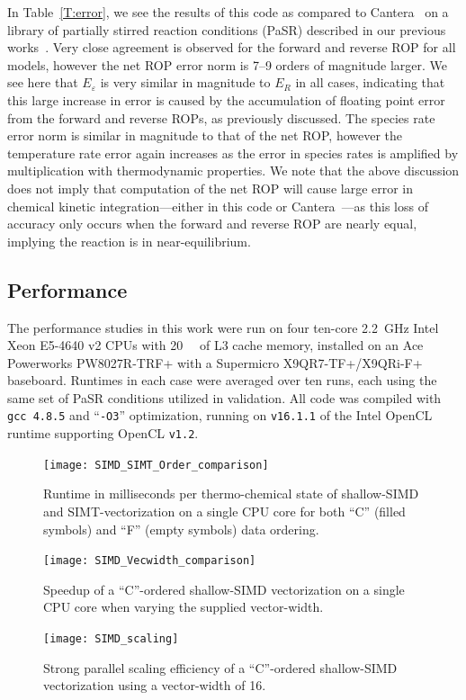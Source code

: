 \documentclass[12pt,number,sort&compress]{elsarticle}
\begin{document}
In Table~\ref{T:error}, we see the results of this code as compared to Cantera~\cite{Cantera} on a library of partially stirred reaction conditions (PaSR) described in our previous works~\cite{CurtisGPU:2017,Niemeyer:2016aa}.
Very close agreement is observed for the forward and reverse ROP for all models, however the net ROP error norm is \numrange{7}{9} orders of magnitude larger.
We see here that $E_{\varepsilon}$ is very similar in magnitude to $E_R$ in all cases, indicating that this large increase in error is caused by the accumulation of floating point error from the forward and reverse ROPs, as previously discussed.
The species rate error norm is similar in magnitude to that of the net ROP, however the temperature rate error again increases as the error in species rates is amplified by multiplication with thermodynamic properties.
We note that the above discussion does not imply that computation of the net ROP will cause large error in chemical kinetic integration---either in this code or Cantera~\cite{Cantera}---as this loss of accuracy only occurs when the forward and reverse ROP are nearly equal, implying the reaction is in near-equilibrium.

\subsection{Performance}
\label{S:results}
The performance studies in this work were run on four ten-core \SI{2.2}{\giga\hertz} Intel Xeon E5-4640 v2 CPUs with \SI{20}{\mega\byte} of L3 cache memory, installed on an Ace Powerworks PW8027R-TRF+ with a Supermicro X9QR7-TF+/X9QRi-F+ baseboard.
Runtimes in each case were averaged over ten runs, each using the same set of PaSR conditions utilized in validation.
All code was compiled with \texttt{gcc 4.8.5} and ``\texttt{-O3}'' optimization, running on \texttt{v16.1.1} of the Intel OpenCL runtime supporting OpenCL \texttt{v1.2}.

\begin{figure}[htb]
  \centering
  \begin{minipage}[t]{0.48\linewidth}
    \texttt{[image: SIMD\_SIMT\_Order\_comparison]}
    \caption{Runtime in milliseconds per thermo-chemical state of shallow-SIMD and SIMT-vectorization on a single CPU core for both ``C'' (filled symbols) and ``F'' (empty symbols) data ordering.}
    \label{F:SIMDComp}
  \end{minipage}
  \hfill
  \begin{minipage}[t]{0.48\linewidth}
    \texttt{[image: SIMD\_Vecwidth\_comparison]}
    \caption{Speedup of a ``C''-ordered shallow-SIMD vectorization on a single CPU core when varying the supplied vector-width.}
    \label{F:Veccomp}
  \end{minipage}
\end{figure}
\begin{figure}[htb]
  \centering
  \begin{minipage}[t]{0.5\linewidth}
    \texttt{[image: SIMD\_scaling]}
    \caption{Strong parallel scaling efficiency of a ``C''-ordered shallow-SIMD vectorization using a vector-width of 16.}
    \label{F:SIMDscale}
  \end{minipage}
\end{figure}
\end{document}
